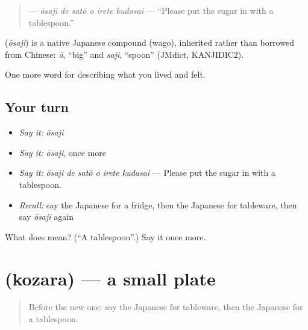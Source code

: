 \begin{quote}
\textbf{   } — \emph{ōsaji de satō o irete kudasai} — \textquotedblleft{}Please put the sugar in with a tablespoon.\textquotedblright{}
\end{quote}

\begin{cousinweb}
\textbf{} (\emph{ōsaji}) is a native Japanese compound (wago), inherited rather than borrowed from Chinese: \emph{ō}, \textquotedblleft{}big\textquotedblright{} and \emph{saji}, \textquotedblleft{}spoon\textquotedblright{} (JMdict, KANJIDIC2).
\end{cousinweb}

\begin{grammarlens}[title={What you've built}]
One more word for describing what you lived and felt.
\end{grammarlens}

\subsection*{Your turn}
\begin{itemize}
\raggedright
  \item \emph{Say it:} \emph{ōsaji}
  \item \emph{Say it:} \emph{ōsaji}, once more
  \item \emph{Say it:} \emph{ōsaji de satō o irete kudasai} — Please put the sugar in with a tablespoon.
  \item \emph{Recall:} say the Japanese for a fridge, then the Japanese for tableware, then say \emph{ōsaji} again
\end{itemize}

\begin{tcolorbox}[breakable,colback=teal!4,colframe=teal!35!black,title={Before you move on}]
What does  mean? (\textquotedblleft{}A tablespoon\textquotedblright{}.) Say it once more.
\end{tcolorbox}
\section[\texorpdfstring{\ja{こざら} (kozara)}{こざら (kozara)}]{ (kozara) — a small plate}

\label{lesson:JA-C475-kozara}



\begin{quote}
Before the new one: say the Japanese for tableware, then the Japanese for a tablespoon.
\end{quote}

